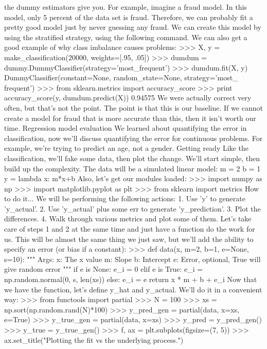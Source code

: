 the dummy estimators give you. For example, imagine a fraud model. In this model, only
5 percent of the data set is fraud. Therefore, we can probably fit a pretty good model just
by never guessing any fraud.
We can create this model by using the stratified strategy, using the following command.
We can also get a good example of why class imbalance causes problems:
>>> X, y = make_classification(20000, weights=[.95, .05])
>>> dumdum = dummy.DummyClassifier(strategy='most_frequent')
>>> dumdum.fit(X, y)
DummyClassifier(constant=None, random_state=None, strategy='most_
frequent')
>>> from sklearn.metrics import accuracy_score
>>> print accuracy_score(y, dumdum.predict(X))
0.94575
We were actually correct very often, but that's not the point. The point is that this is our
baseline. If we cannot create a model for fraud that is more accurate than this, then it
isn't worth our time.
Regression model evaluation
We learned about quantifying the error in classification, now we'll discuss quantifying the error
for continuous problems. For example, we're trying to predict an age, not a gender.
Getting ready
Like the classification, we'll fake some data, then plot the change. We'll start simple, then
build up the complexity. The data will be a simulated linear model:
m = 2
b = 1
y = lambda x: m*x+b
Also, let's get our modules loaded:
>>> import numpy as np
>>> import matplotlib.pyplot as plt
>>> from sklearn import metrics
How to do it...
We will be performing the following actions:
1. Use 'y' to generate 'y_actual'.
2. Use 'y_actual' plus some err to generate 'y_prediction'.
3. Plot the differences.
4. Walk through various metrics and plot some of them.
Let's take care of steps 1 and 2 at the same time and just have a function do the work for us.
This will be almost the same thing we just saw, but we'll add the ability to specify an error
(or bias if a constant):
>>> def data(x, m=2, b=1, e=None, s=10):
"""
Args:
x: The x value
m: Slope
b: Intercept
e: Error, optional, True will give random error
"""
if e is None:
e_i = 0
elif e is True:
e_i = np.random.normal(0, s, len(xs))
else:
e_i = e
return x * m + b + e_i
Now that we have the function, let's define y_hat and y_actual. We'll do it in a
convenient way:
>>> from functools import partial
>>> N = 100
>>> xs = np.sort(np.random.rand(N)*100)
>>> y_pred_gen = partial(data, x=xs, e=True)
>>> y_true_gen = partial(data, x=xs)
>>> y_pred = y_pred_gen()
>>> y_true = y_true_gen()
>>> f, ax = plt.subplots(figsize=(7, 5))
>>> ax.set_title("Plotting the fit vs the underlying process.")
